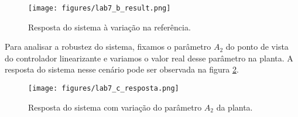 \documentclass[a4paper]{report}
\begin{document}
\begin{figure}[H]
    \centering
    \texttt{[image: figures/lab7\_b\_result.png]}
    \caption{Resposta do sistema à variação na referência.}
    \label{fig:figures-lab7_b_result-png}
\end{figure}


Para analisar a robustez do sistema, fixamos o parâmetro $A_2$ do ponto de vista do controlador linearizante e variamos o valor real desse parâmetro na planta. A resposta do sistema nesse cenário pode ser observada na figura \ref{fig:figures-lab7_c_resposta-png}.

\begin{figure}[H]
    \centering
    \texttt{[image: figures/lab7\_c\_resposta.png]}
    \caption{Resposta do sistema com variação do parâmetro $A_2$ da planta.}
    \label{fig:figures-lab7_c_resposta-png}
\end{figure}
\end{document}
